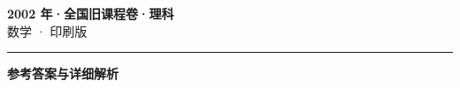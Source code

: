 \documentclass[zihao=5, a4paper]{ctexart}
\begin{document}
\begin{center}
  {\Large\bfseries 2002 年·全国旧课程卷·理科}\\[4pt]
  {\large 数学 · 印刷版}
\end{center}
\medskip
{}

\par\bigskip\hrule\bigskip
{}
\begin{center}{\large\bfseries 参考答案与详细解析}\end{center}
\smallskip

\end{document}

